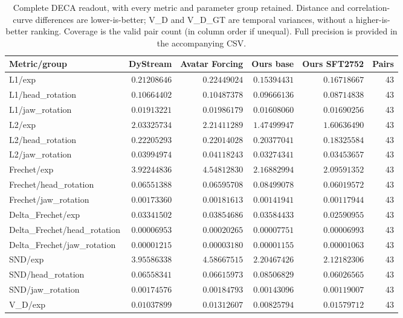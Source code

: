 \begin{table}[t]
\centering\small
\caption{Complete DECA readout, with every metric and parameter group retained. Distance and correlation-curve differences are lower-is-better; V\_D and V\_D\_GT are temporal variances, without a higher-is-better ranking. Coverage is the valid pair count (in column order if unequal). Full precision is provided in the accompanying CSV.}
\label{tab:vico43-deca-complete}
\setlength{\tabcolsep}{4pt}
\begin{tabular}{lrrrrr}
\toprule
Metric/group & DyStream & Avatar Forcing & Ours base & Ours SFT2752 & Pairs \\
\midrule
L1/exp & $0.21208646$ & $0.22449024$ & $0.15394431$ & $0.16718667$ & 43 \\
L1/head\_rotation & $0.10664402$ & $0.10487378$ & $0.09666136$ & $0.08714838$ & 43 \\
L1/jaw\_rotation & $0.01913221$ & $0.01986179$ & $0.01608060$ & $0.01690256$ & 43 \\
L2/exp & $2.03325734$ & $2.21411289$ & $1.47499947$ & $1.60636490$ & 43 \\
L2/head\_rotation & $0.22205293$ & $0.22014028$ & $0.20377041$ & $0.18325584$ & 43 \\
L2/jaw\_rotation & $0.03994974$ & $0.04118243$ & $0.03274341$ & $0.03453657$ & 43 \\
Frechet/exp & $3.92244836$ & $4.54812830$ & $2.16882994$ & $2.09591352$ & 43 \\
Frechet/head\_rotation & $0.06551388$ & $0.06595708$ & $0.08499078$ & $0.06019572$ & 43 \\
Frechet/jaw\_rotation & $0.00173360$ & $0.00181613$ & $0.00141941$ & $0.00117944$ & 43 \\
Delta\_Frechet/exp & $0.03341502$ & $0.03854686$ & $0.03584433$ & $0.02590955$ & 43 \\
Delta\_Frechet/head\_rotation & $0.00006953$ & $0.00020265$ & $0.00007751$ & $0.00006993$ & 43 \\
Delta\_Frechet/jaw\_rotation & $0.00001215$ & $0.00003180$ & $0.00001155$ & $0.00001063$ & 43 \\
SND/exp & $3.95586338$ & $4.58667515$ & $2.20467426$ & $2.12182306$ & 43 \\
SND/head\_rotation & $0.06558341$ & $0.06615973$ & $0.08506829$ & $0.06026565$ & 43 \\
SND/jaw\_rotation & $0.00174576$ & $0.00184793$ & $0.00143096$ & $0.00119007$ & 43 \\
V\_D/exp & $0.01037899$ & $0.01312607$ & $0.00825794$ & $0.01579712$ & 43 \\

\end{tabular}
\end{table}

